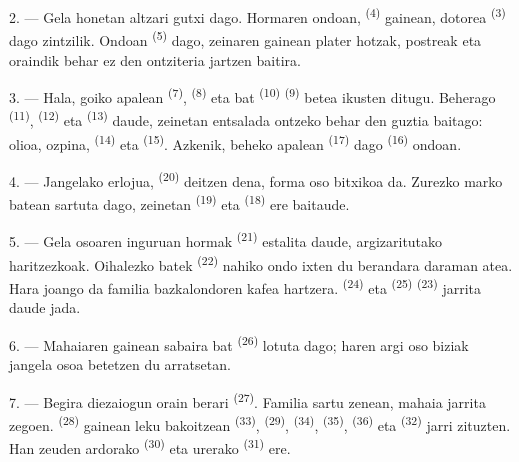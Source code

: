 2. --- Gela honetan altzari gutxi dago. Hormaren ondoan, 
\textsuperscript{(4)} gainean,  dotorea
\textsuperscript{(3)} dago zintzilik. Ondoan 
\textsuperscript{(5)} dago, zeinaren gainean plater hotzak, postreak eta oraindik
behar ez den ontziteria jartzen baitira.

3. --- Hala, goiko apalean  \textsuperscript{(7)},
 \textsuperscript{(8)} eta  bat
\textsuperscript{(10)}  \textsuperscript{(9)} betea ikusten
ditugu.
Beherago  \textsuperscript{(11)}, 
\textsuperscript{(12)} eta  \textsuperscript{(13)} daude,
zeinetan entsalada ontzeko behar den guztia baitago: olioa, ozpina,
 \textsuperscript{(14)} eta 
\textsuperscript{(15)}. Azkenik, beheko apalean 
\textsuperscript{(17)} dago  \textsuperscript{(16)}
ondoan.

4. --- Jangelako erlojua,  \textsuperscript{(20)} deitzen
dena, forma oso bitxikoa da. Zurezko marko batean sartuta dago, zeinetan
 \textsuperscript{(19)} eta 
\textsuperscript{(18)} ere baitaude.

\VUsaut{4.6mm}
\VUsaut{3.0mm}

5. --- Gela osoaren inguruan hormak 
\textsuperscript{(21)} estalita daude, argizaritutako haritzezkoak. Oihalezko
 batek \textsuperscript{(22)} nahiko ondo ixten du berandara
daraman atea. Hara joango da familia bazkalondoren kafea hartzera.
 \textsuperscript{(24)} eta 
\textsuperscript{(25)}  \textsuperscript{(23)} jarrita
daude jada.

6. --- Mahaiaren gainean sabaira  bat
\textsuperscript{(26)} lotuta dago; haren argi oso biziak jangela osoa betetzen du
arratsetan.

7. --- Begira diezaiogun orain  berari
\textsuperscript{(27)}. Familia sartu zenean, mahaia jarrita zegoen.
 \textsuperscript{(28)} gainean leku bakoitzean
 \textsuperscript{(33)}, 
\textsuperscript{(29)},  \textsuperscript{(34)},
 \textsuperscript{(35)},  \textsuperscript{(36)}
eta  \textsuperscript{(32)} jarri zituzten. Han zeuden
ardorako  \textsuperscript{(30)} eta urerako 
\textsuperscript{(31)} ere.

